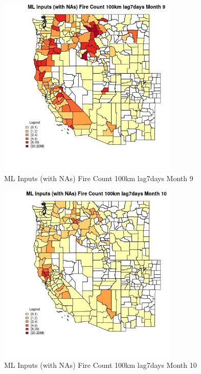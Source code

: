 \begin{figure} 
\centering  
\includegraphics[width=0.77\textwidth]{Code_Outputs/Report_ML_input_PM25_Step4_part_e_de_duplicated_aves_compiled_2019-05-20wNAs_CountyFire_Count_100km_lag7daysmedianMonth9.jpg} 
\caption{\label{fig:Report_ML_input_PM25_Step4_part_e_de_duplicated_aves_compiled_2019-05-20wNAsCountyFire_Count_100km_lag7daysmedianMonth9}ML Inputs (with NAs) Fire Count 100km lag7days Month 9} 
\end{figure} 
 

\begin{figure} 
\centering  
\includegraphics[width=0.77\textwidth]{Code_Outputs/Report_ML_input_PM25_Step4_part_e_de_duplicated_aves_compiled_2019-05-20wNAs_CountyFire_Count_100km_lag7daysmedianMonth10.jpg} 
\caption{\label{fig:Report_ML_input_PM25_Step4_part_e_de_duplicated_aves_compiled_2019-05-20wNAsCountyFire_Count_100km_lag7daysmedianMonth10}ML Inputs (with NAs) Fire Count 100km lag7days Month 10} 
\end{figure} 
 

